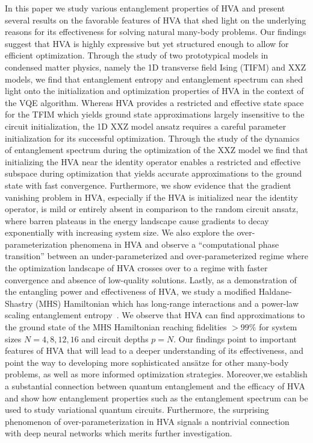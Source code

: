 \documentclass[
 aps,
 pra,
 showpacs,
 showkeys,
 superscriptaddress,
 reprint,%
twocolumn,
]{revtex4-1}
\begin{document}
In this paper we study various entanglement properties of HVA and present several results on the favorable features of HVA that shed light on the underlying reasons for its effectiveness for solving natural many-body problems. Our findings suggest that HVA is highly expressive but yet structured enough to allow for efficient optimization. Through the study of two prototypical models in condensed matter physics, namely the 1D transverse field Ising (TIFM) and XXZ models, we find that entanglement entropy and entanglement spectrum can shed light onto the initialization and optimization properties of HVA in the context of the VQE algorithm. Whereas HVA provides a restricted and effective state space for the TFIM which yields ground state approximations largely insensitive to the circuit initialization, the 1D XXZ model ansatz requires a careful parameter initialization for its successful optimization.  Through the study of the dynamics of entanglement spectrum during the optimization of the XXZ model we find that initializing the HVA near the identity operator enables a restricted and effective subspace during optimization that yields accurate approximations to the ground state with fast convergence. Furthermore, we show evidence that the gradient vanishing problem in HVA, especially if the HVA is initialized near the identity operator, is mild or entirely absent in comparison to the random circuit ansatz, where barren plateaus in the energy landscape cause gradients to decay exponentially with increasing system size. We also explore the over-parameterization phenomena in HVA and observe a ``computational phase transition'' between an under-parameterized and over-parameterized regime where the  optimization landscape of HVA crosses over to a regime with faster convergence and absence of low-quality solutions.  Lastly, as a demonstration of the entangling power and effectiveness of HVA, we study a modified Haldane-Shastry (MHS) Hamiltonian which has long-range interactions and a power-law scaling entanglement entropy~\cite{Deng2017}. We observe that HVA can find approximations to the ground state of the MHS Hamiltonian reaching fidelities $>99\%$ for system sizes $N=4,8,12,16$  and circuit depths $p=N$. Our findings point to important features of HVA that will lead to a deeper understanding of its effectiveness, and point the way to developing more sophisticated ans\"atze for other many-body problems, as well as more informed optimization strategies. Moreover,we establish a substantial connection between quantum entanglement and the efficacy of HVA and show how entanglement properties such as the entanglement spectrum can be used to study variational quantum circuits. Furthermore, the surprising phenomenon of over-parameterization in HVA signals a nontrivial connection with deep neural networks which merits further investigation.
\end{document}
